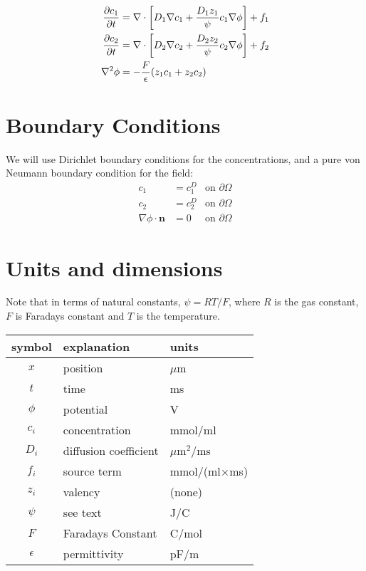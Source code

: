 \documentclass[12pt]{article}
\newcommand{\nvec}{\textbf{n}}
\begin{document}
\begin{align}
{\partial c_1 \over \partial t} & = \nabla \cdot \left[ D_1\nabla c_1 + {D_1z_1 \over \psi} c_1 \nabla \phi \right] + f_1 \\ 
{\partial c_2 \over \partial t} & = \nabla \cdot \left[ D_2\nabla c_2 + {D_2z_2 \over \psi} c_2 \nabla \phi\right] + f_2 \\ 
\nabla^2 \phi & =-{F \over \epsilon} (z_1c_1 + z_2c_2)\label{eq:phi}
\end{align}

\section{Boundary Conditions}

We will use Dirichlet boundary conditions for the concentrations, and a pure von Neumann boundary condition for the field: 
\begin{align}
c_1 & = c_1^D & \text{on } \partial \Omega \\
c_2 & = c_2^D & \text{on } \partial \Omega \\
\nabla \phi \cdot \nvec & = 0 & \text{on } \partial \Omega 
\end{align}

 
\section{Units and dimensions}
Note that in terms of natural constants, $\psi = RT/F$, where $R$ is the gas constant, $F$ is Faradays constant and $T$ is the temperature.
\begin{center}
 \begin{tabular}{c|l|l}
 symbol & explanation & units \\
 \hline
 $x$ & position & $\mu$m \\
 $t$ & time & ms \\
 $\phi$ & potential & V \\
 $c_i$ & concentration & mmol/ml \\ 
 $D_i$ & diffusion coefficient & $\mu$m$^2$/ms \\
 $f_i$ & source term & mmol/(ml$\times$ms) \\
 $z_i$ & valency & (none) \\
 $\psi$ & see text & J/C \\
 $F$ & Faradays Constant & C/mol \\
 $\epsilon$ & permittivity & pF/m \\
 \end{tabular}
 \end{center}
\end{document}
